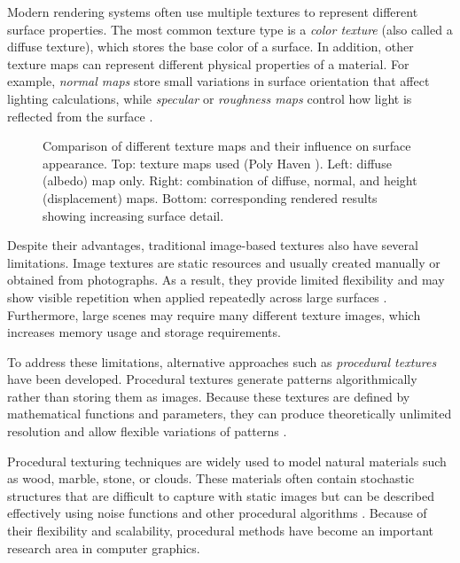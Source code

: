 Modern rendering systems often use multiple textures to represent different surface properties. The most common texture type is a \textit{color texture} (also called a diffuse texture), which stores the base color of a surface. In addition, other texture maps can represent different physical properties of a material. For example, \textit{normal maps} store small variations in surface orientation that affect lighting calculations, while \textit{specular} or \textit{roughness maps} control how light is reflected from the surface \cite{akenine2018realtime}.

\begin{figure}[H]
    \centering
    {Comparison of different texture maps and their influence on surface appearance. Top: texture maps used (Poly Haven \cite{polyhaven_rock_wall_16}). Left: diffuse (albedo) map only. Right: combination of diffuse, normal, and height (displacement) maps. Bottom: corresponding rendered results showing increasing surface detail.}
    \label{fig:texture-map-comparison}
\end{figure}

Despite their advantages, traditional image-based textures also have several limitations. Image textures are static resources and usually created manually or obtained from photographs. As a result, they provide limited flexibility and may show visible repetition when applied repeatedly across large surfaces \cite{ebert2003texturing}. Furthermore, large scenes may require many different texture images, which increases memory usage and storage requirements.

To address these limitations, alternative approaches such as \textit{procedural textures} have been developed. Procedural textures generate patterns algorithmically rather than storing them as images. Because these textures are defined by mathematical functions and parameters, they can produce theoretically unlimited resolution and allow flexible variations of patterns \cite{ebert2003texturing, wiki_procedural_texture}.

\clearpage
Procedural texturing techniques are widely used to model natural materials such as wood, marble, stone, or clouds. These materials often contain stochastic structures that are difficult to capture with static images but can be described effectively using noise functions and other procedural algorithms \cite{ebert2003texturing}. Because of their flexibility and scalability, procedural methods have become an important research area in computer graphics.

